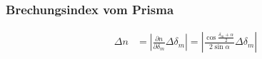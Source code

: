 \subsubsection{Brechungsindex vom Prisma}
\begin{align}
	\Delta n &= \left|\frac{\partial n}{\partial \delta_m} \Delta \delta_m\right|
	= \left|\frac{\cos\frac{\delta_m + \alpha}{2}}{2\sin\alpha}\Delta \delta_m\right| \label{eq:err:npris}
\end{align}
%
%
